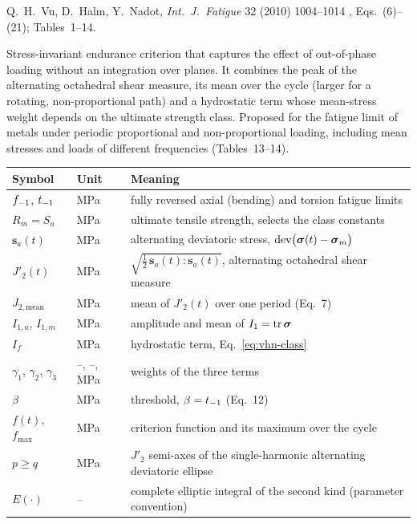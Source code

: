 \label{sheet:VHN}

 Q.~H.~Vu, D.~Halm, Y.~Nadot, \emph{Int.\ J.\ Fatigue} 32 (2010) 1004--1014
\cite{vu2010}, Eqs.~(6)--(21); Tables~1--14.

 Stress-invariant endurance criterion that captures the effect of out-of-phase
loading without an integration over planes. It combines the peak of the alternating octahedral shear
measure, its mean over the cycle (larger for a rotating, non-proportional path) and a hydrostatic
term whose mean-stress weight depends on the ultimate strength class. Proposed for the fatigue limit
of metals under periodic proportional and non-proportional loading, including mean stresses and
loads of different frequencies (Tables~13--14).

\begin{center}\small
\begin{tabular}{@{}llp{100mm}@{}}
\toprule
Symbol & Unit & Meaning\\\midrule
$f_{-1}$, $t_{-1}$ & MPa & fully reversed axial (bending) and torsion fatigue limits\\
$R_m=S_u$ & MPa & ultimate tensile strength, selects the class constants\\
$\mathbf s_a(t)$ & MPa & alternating deviatoric stress, $\operatorname{dev}\bigl(\boldsymbol\sigma(t)-\boldsymbol\sigma_m\bigr)$\\
$J'_2(t)$ & MPa & $\sqrt{\tfrac12\,\mathbf s_a(t):\mathbf s_a(t)}$, alternating octahedral shear measure\\
$J_{2,\mathrm{mean}}$ & MPa & mean of $J'_2(t)$ over one period (Eq.~7)\\
$I_{1,a}$, $I_{1,m}$ & MPa & amplitude and mean of $I_1=\operatorname{tr}\boldsymbol\sigma$\\
$I_f$ & MPa & hydrostatic term, Eq.~\eqref{eq:vhn-class}\\
$\gamma_1$, $\gamma_2$, $\gamma_3$ & --, --, MPa & weights of the three terms\\
$\beta$ & MPa & threshold, $\beta=t_{-1}$ (Eq.~12)\\
$f(t)$, $f_{\max}$ & MPa & criterion function and its maximum over the cycle\\
$p\ge q$ & MPa & $J'_2$ semi-axes of the single-harmonic alternating deviatoric ellipse\\
$E(\cdot)$ & -- & complete elliptic integral of the second kind (parameter convention)\\
\bottomrule
\end{tabular}
\end{center}

